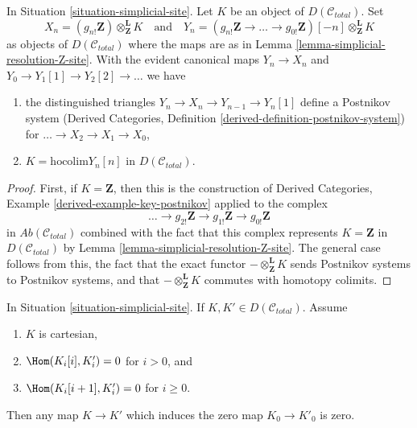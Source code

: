 \begin{lemma}
\label{lemma-abelian-postnikov}
In Situation \ref{situation-simplicial-site}. Let $K$ be
an object of $D(\mathcal{C}_{total})$. Set
$$
X_n = (g_{n!}\mathbf{Z})
\otimes^\mathbf{L}_\mathbf{Z} K
\quad\text{and}\quad
Y_n =
(g_{n!}\mathbf{Z} \to \ldots \to g_{0!}\mathbf{Z})[-n]
\otimes^\mathbf{L}_\mathbf{Z} K
$$
as objects of $D(\mathcal{C}_{total})$ where the maps are
as in Lemma \ref{lemma-simplicial-resolution-Z-site}.
With the evident canonical maps $Y_n \to X_n$ and
$Y_0 \to Y_1[1] \to Y_2[2] \to \ldots$ we have
\begin{enumerate}
\item the distinguished triangles $Y_n \to X_n \to Y_{n - 1} \to Y_n[1]$
define a Postnikov system
(Derived Categories, Definition \ref{derived-definition-postnikov-system})
for $\ldots \to X_2 \to X_1 \to X_0$,
\item $K = \text{hocolim} Y_n[n]$ in $D(\mathcal{C}_{total})$.
\end{enumerate}
\end{lemma}

\begin{proof}
First, if $K = \mathbf{Z}$, then this is the construction of
Derived Categories, Example \ref{derived-example-key-postnikov}
applied to the complex
$$
\ldots \to
g_{2!}\mathbf{Z} \to
g_{1!}\mathbf{Z} \to
g_{0!}\mathbf{Z}
$$
in $\textit{Ab}(\mathcal{C}_{total})$ combined with the fact that
this complex represents $K = \mathbf{Z}$ in $D(\mathcal{C}_{total})$
by Lemma \ref{lemma-simplicial-resolution-Z-site}.
The general case follows from this, the fact that the exact functor
$- \otimes^\mathbf{L}_\mathbf{Z} K$ sends Postnikov systems to
Postnikov systems, and
that $- \otimes^\mathbf{L}_\mathbf{Z} K$ commutes with homotopy colimits.
\end{proof}

\begin{lemma}
\label{lemma-nullity-cartesian-objects-derived}
In Situation \ref{situation-simplicial-site}.
If $K, K' \in D(\mathcal{C}_{total})$.
Assume
\begin{enumerate}
\item $K$ is cartesian,
\item $\Hom(K_i[i], K'_i) = 0$ for $i > 0$, and
\item $\Hom(K_i[i + 1], K'_i) = 0$ for $i \geq 0$.
\end{enumerate}
Then any map $K \to K'$ which induces the zero map $K_0 \to K'_0$ is zero.
\end{lemma}

